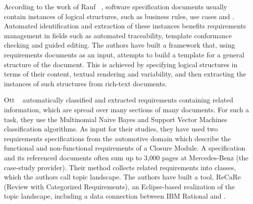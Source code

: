 According to the work of Rauf \etal~\cite{Rauf:2011}, software specification
documents usually contain instances of logical structures, such as business rules, use cases and
\FRs. Automated identification and extraction of these instances benefits
requirements management in fields such as automated traceability, template
conformance checking and guided editing. The authors have built a framework
that, using requirements documents as an input, attempts to build a template
for a general structure of the document. This is achieved by specifying
logical structures in terms of their content, textual rendering and variability,
and then extracting the instances of such structures from rich-text documents.

Ott \etal~\cite{Ott:2013} automatically classified and extracted requirements
containing related information, which are spread over many sections of many
documents. For such a task, they use the Multinomial Naive Bayes and Support
Vector Machines classification algorithms. As input for their studies, they have
used two requirements specifications from the automotive domain which describe
the functional and non-functional requirements of a \DOORS Closure Module. A
specification and its referenced documents often sum up to 3,000 pages at
Mercedes-Benz (the case-study provider). Their method collects related
requirements into classes, which the authors call topic landscape. The
authors have built a tool, ReCaRe (Review with Categorized Requirements), an
Eclipse-based realization of the topic landscape, including a data connection
between IBM Rational and \DOORS.





